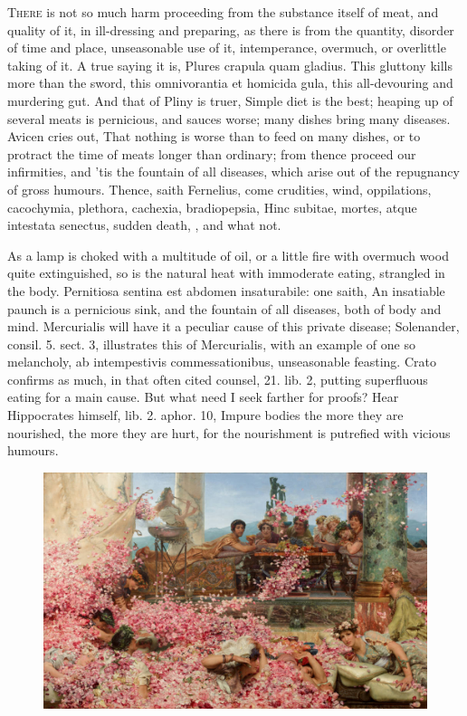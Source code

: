 {{\lettrine{T}{here} is not so much harm proceeding from the substance itself of meat,
and quality of it, in ill-dressing and preparing, as there is from the
quantity, disorder of time and place, unseasonable use of it, 
intemperance, overmuch, or overlittle taking of it. A true saying it
is, Plures crapula quam gladius. This gluttony kills more than the
sword, this omnivorantia et homicida gula, this all-devouring and
murdering gut. And that of Pliny is truer, Simple diet is the
best; heaping up of several meats is pernicious, and sauces worse; many
dishes bring many diseases. Avicen cries out, That nothing is
worse than to feed on many dishes, or to protract the time of meats
longer than ordinary; from thence proceed our infirmities, and 'tis the
fountain of all diseases, which arise out of the repugnancy of gross
humours. Thence, saith  Fernelius, come crudities, wind,
oppilations, cacochymia, plethora, cachexia, bradiopepsia, Hinc
subitae, mortes, atque intestata senectus, sudden death, \etc{}, and what
not.

As a lamp is choked with a multitude of oil, or a little fire with
overmuch wood quite extinguished, so is the natural heat with
immoderate eating, strangled in the body. Pernitiosa sentina est
abdomen insaturabile: one saith, An insatiable paunch is a pernicious
sink, and the fountain of all diseases, both of body and mind.
Mercurialis will have it a peculiar cause of this private
disease; Solenander, consil. 5. sect. 3, illustrates this of
Mercurialis, with an example of one so melancholy, ab intempestivis
commessationibus, unseasonable feasting. Crato confirms as much,
in that often cited counsel, 21. lib. 2, putting superfluous eating for
a main cause. But what need I seek farther for proofs? Hear
Hippocrates himself, lib. 2. aphor. 10, Impure bodies the more
they are nourished, the more they are hurt, for the nourishment is
putrefied with vicious humours.

\begin{figure}[H]
  \begingroup
  \centering
  \includegraphics[keepaspectratio,width=\textwidth]{figures/heliogabalus-small.jpg}
  \label{fig:heliogabalus}
\end{figure}

}}
